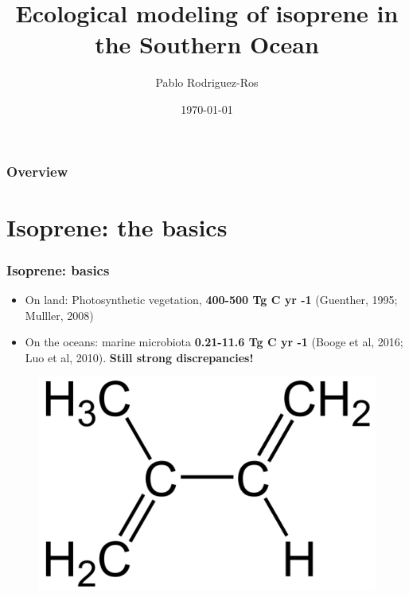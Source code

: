 \documentclass{beamer}
\title[Isoprene in the Southern Ocean]{Ecological modeling of isoprene in the Southern Ocean} %
\author{Pablo Rodriguez-Ros} %
\institute[ICM-CSIC] %
{
Institute of Marine Sciences (ICM) -- Spanish National Research Council (CSIC) \\ \bigskip \textbf{SORPASSO Project (ACE 8) \\ NOSASSO -- Plymouth Marine Laboratory (PML)}\\ %

\medskip
P. Rodr\'{i}guez-Ros, C. Nissen, P. Cort\'{e}s , N. Gruber, R. Sim\'{o}, S. Vallina, M. Vogt

\medskip

\textit{pros@icm.csic.es\\Twitter: @pablorros\_\\} %
}
\begin{document}
\begin{frame}
\titlepage %
\date{\today} %
\end{frame}

\begin{frame}
\frametitle{Overview} %
\tableofcontents %
\end{frame}


\section{Isoprene: the basics} 

\begin{frame}
\frametitle{Isoprene: basics}

\begin{itemize}
\item On land: Photosynthetic vegetation, \textbf{400-500 Tg C yr -1} (Guenther, 1995; Mulller, 2008)
\item On the oceans: marine microbiota \textbf{0.21-11.6 Tg C yr -1} (Booge et al, 2016; Luo et al, 2010). \textbf{Still strong discrepancies!}

\end{itemize}

\begin{figure}
\includegraphics[width=0.5\linewidth]{Isoprene-Structure.png}
\end{figure}

\end{frame}
\end{document}
